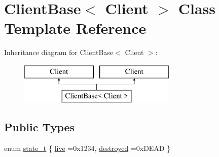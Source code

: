 \hypertarget{classClientBase}{}\section{Client\+Base$<$ Client $>$ Class Template Reference}
\label{classClientBase}
Inheritance diagram for Client\+Base$<$ Client $>$\+:\begin{figure}[H]
\begin{center}
\leavevmode
\includegraphics[height=2.000000cm]{classClientBase}
\end{center}
\end{figure}
\subsection*{Public Types}
\begin{DoxyCompactItemize}
\item 
enum \hyperlink{classClientBase_a2c65b478eaf40b5bf4c6f7fb83a81990}{state\+\_\+t} \{ \hyperlink{classClientBase_a2c65b478eaf40b5bf4c6f7fb83a81990a9c48c59ce92b8985d50fb31e0bba1b83}{live} =0x1234, 
\hyperlink{classClientBase_a2c65b478eaf40b5bf4c6f7fb83a81990a17121ecf8d6185605b0a86cd033a11d4}{destroyed} =0x\+D\+E\+A\+D
 \}
\end{DoxyCompactItemize}
